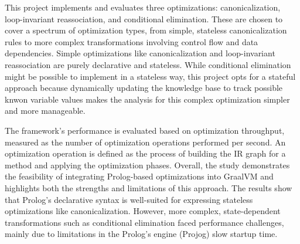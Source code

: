This project implements and evaluates three optimizations: canonicalization, loop-invariant reassociation, and conditional elimination.
These are chosen to cover a spectrum of optimization types, from simple, stateless canonicalization rules to more complex transformations involving control flow and data dependencies.
Simple optimizations like canonicalization and loop-invariant reassociation are purely declarative and stateless. 
While conditional elimination might be possible to implement in a stateless way, this project opts for a stateful approach because dynamically updating the knowledge base to track possible knwon variable values makes the analysis for this complex optimization simpler and more manageable.

The framework’s performance is evaluated based on optimization throughput, measured as the number of optimization operations performed per second.
An optimization operation is defined as the process of building the IR graph for a method and applying the optimization phases.
Overall, the study demonstrates the feasibility of integrating Prolog-based optimizations into GraalVM and highlights both the strengths and limitations of this approach.
The results show that Prolog’s declarative syntax is well-suited for expressing stateless optimizations like canonicalization. However, more complex, state-dependent transformations such as conditional elimination faced performance challenges, mainly due to limitations in the Prolog’s engine (Projog) slow startup time.
